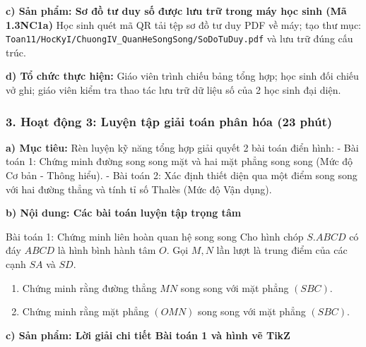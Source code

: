 \documentclass[12pt, a4paper]{article}
\begin{document}
\noindent \textbf{c) Sản phẩm: Sơ đồ tư duy số được lưu trữ trong máy học sinh (Mã 1.3NC1a)}
Học sinh quét mã QR tải tệp sơ đồ tư duy PDF về máy; tạo thư mục: \texttt{Toan11/HocKyI/ChuongIV\_QuanHeSongSong/SoDoTuDuy.pdf} và lưu trữ đúng cấu trúc.

\noindent \textbf{d) Tổ chức thực hiện:}
Giáo viên trình chiếu bảng tổng hợp; học sinh đối chiếu vở ghi; giáo viên kiểm tra thao tác lưu trữ dữ liệu số của 2 học sinh đại diện.

\subsubsection*{3. Hoạt động 3: Luyện tập giải toán phân hóa (23 phút)}

\noindent \textbf{a) Mục tiêu:}
Rèn luyện kỹ năng tổng hợp giải quyết 2 bài toán điển hình:
- Bài toán 1: Chứng minh đường song song mặt và hai mặt phẳng song song (Mức độ Cơ bản - Thông hiểu).
- Bài toán 2: Xác định thiết diện qua một điểm song song với hai đường thẳng và tính tỉ số Thalès (Mức độ Vận dụng).

\noindent \textbf{b) Nội dung: Các bài toán luyện tập trọng tâm}
\begin{pedabox}{Bài toán 1: Chứng minh liên hoàn quan hệ song song}
Cho hình chóp $S.ABCD$ có đáy $ABCD$ là hình bình hành tâm $O$. Gọi $M, N$ lần lượt là trung điểm của các cạnh $SA$ và $SD$.
\begin{enumerate}[leftmargin=0.6cm]
    \item Chứng minh rằng đường thẳng $MN$ song song với mặt phẳng $(SBC)$.
    \item Chứng minh rằng mặt phẳng $(OMN)$ song song với mặt phẳng $(SBC)$.
\end{enumerate}
\end{pedabox}

\noindent \textbf{c) Sản phẩm: Lời giải chi tiết Bài toán 1 và hình vẽ TikZ}
\begin{center}
\end{center}
\end{document}
